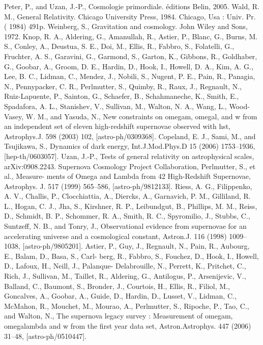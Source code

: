 \documentclass[a4paper,12pt]{report}
\theoremstyle{plain}
\theoremstyle{plain}
\begin{document}
\begin{thebibliography}{90}


 Peter, P., and Uzan, J.-P., Cosmologie primordiale. \'editions Belin, 2005.
 Wald, R. M., General Relativity. Chicago University Press, 1984. Chicago, Usa :
Univ. Pr. ( 1984) 491p.
 Weinberg, S., Gravitation and cosmology. John Wiley and Sons, 1972.
 Knop, R. A., Aldering, G., Amanullah, R., Astier, P., Blanc, G., Burns, M. S., Conley,
A., Deustua, S. E., Doi, M., Ellis, R., Fabbro, S., Folatelli, G., Fruchter, A. S.,
Garavini, G., Garmond, S., Garton, K., Gibbons, R., Goldhaber, G., Goobar, A.,
Groom, D. E., Hardin, D., Hook, I., Howell, D. A., Kim, A. G., Lee, B. C., Lidman,
C., Mendez, J., Nobili, S., Nugent, P. E., Pain, R., Panagia, N., Pennypacker, C. R.,
Perlmutter, S., Quimby, R., Raux, J., Regnault, N., Ruiz-Lapuente, P., Sainton, G.,
Schaefer, B., Schahmaneche, K., Smith, E., Spadafora, A. L., Stanishev, V., Sullivan,
M., Walton, N. A., Wang, L., Wood-Vasey, W. M., and Yasuda, N., New constraints
on omegam, omegal, and w from an independent set of eleven high-redshift supernovae
observed with hst, Astrophys.J. 598 (2003) 102, [astro-ph/0309368].
 Copeland, E. J., Sami, M., and Tsujikawa, S., Dynamics of dark energy,
Int.J.Mod.Phys.D 15 (2006) 1753–1936, [hep-th/0603057].
 Uzan, J.-P., Tests of general relativity on astrophysical scales, arXiv:0908.2243.
 Supernova Cosmology Project Collaboration, Perlmutter, S., et al., Measure-
ments of Omega and Lambda from 42 High-Redshift Supernovae, Astrophys. J. 517
(1999) 565–586, [astro-ph/9812133].
 Riess, A. G., Filippenko, A. V., Challis, P., Clocchiattia, A., Diercks, A., Garnavich,
P. M., Gilliland, R. L., Hogan, C. J., Jha, S., Kirshner, R. P., Leibundgut, B., Phillips,
M. M., Reiss, D., Schmidt, B. P., Schommer, R. A., Smith, R. C., Spyromilio, J.,
Stubbs, C., Suntzeff, N. B., and Tonry, J., Observational evidence from supernovae
for an accelerating universe and a cosmological constant, Astron.J. 116 (1998) 1009–
1038, [astro-ph/9805201].
 Astier, P., Guy, J., Regnault, N., Pain, R., Aubourg, E., Balam, D., Basa, S., Carl-
berg, R., Fabbro, S., Fouchez, D., Hook, I., Howell, D., Lafoux, H., Neill, J., Palanque-
Delabrouille, N., Perrett, K., Pritchet, C., Rich, J., Sullivan, M., Taillet, R., Aldering,
G., Antilogus, P., Arsenijevic, V., Balland, C., Baumont, S., Bronder, J., Courtois,
H., Ellis, R., Filiol, M., Goncalves, A., Goobar, A., Guide, D., Hardin, D., Lusset,
V., Lidman, C., McMahon, R., Mouchet, M., Mourao, A., Perlmutter, S., Ripoche,
P., Tao, C., and Walton, N., The supernova legacy survey : Measurement of omegam,
omegalambda and w from the first year data set, Astron.Astrophys. 447 (2006) 31–48,
[astro-ph/0510447].


\end{thebibliography}
\end{document}
